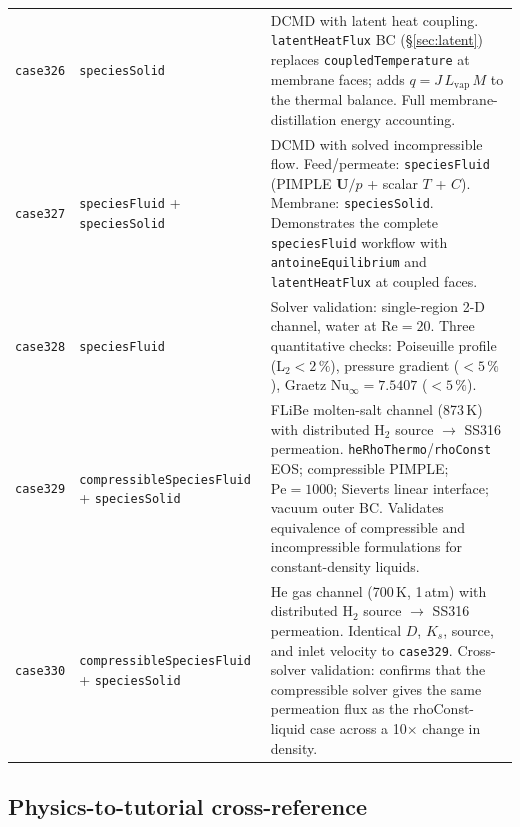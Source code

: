\documentclass[11pt,a4paper]{article}
\newcommand{\caseref}[1]{\texttt{\color{casegreen}#1}}
\newcommand{\bctype}[1]{\texttt{\color{foamblue}#1}}
\begin{document}
\begin{longtable}{%
  >{\raggedright\arraybackslash}p{1.8cm}
  >{\raggedright\arraybackslash}p{5.0cm}
  p{\dimexpr\linewidth-1.8cm-5.0cm-4\tabcolsep\relax}}
\caseref{case326} & \texttt{speciesSolid} &
  DCMD with latent heat coupling.
  \bctype{latentHeatFlux} BC (§\ref{sec:latent}) replaces
  \bctype{coupledTemperature} at membrane faces; adds $q = J\,L_\text{vap}\,M$
  to the thermal balance.  Full membrane-distillation energy accounting. \\[2pt]

\caseref{case327} & \texttt{speciesFluid} + \texttt{speciesSolid} &
  DCMD with solved incompressible flow.  Feed/permeate: \texttt{speciesFluid}
  (PIMPLE $\mathbf{U}/p$ + scalar $T$ + $C$).  Membrane: \texttt{speciesSolid}.
  Demonstrates the complete \texttt{speciesFluid} workflow with
  \bctype{antoineEquilibrium} and \bctype{latentHeatFlux} at coupled faces. \\[2pt]

\caseref{case328} & \texttt{speciesFluid} &
  Solver validation: single-region 2-D channel, water at Re$=20$.
  Three quantitative checks: Poiseuille profile (L$_2 < 2\,\%$),
  pressure gradient ($<5\,\%$), Graetz Nu$_\infty = 7.5407$ ($<5\,\%$). \\[2pt]

\caseref{case329} & \texttt{compressibleSpeciesFluid} + \texttt{speciesSolid} &
  FLiBe molten-salt channel (873\,K) with distributed H$_2$ source $\to$
  SS316 permeation.  \texttt{heRhoThermo}/\texttt{rhoConst} EOS; compressible
  PIMPLE; $\mathrm{Pe} = 1000$; Sieverts linear interface; vacuum outer BC.
  Validates equivalence of compressible and incompressible formulations for
  constant-density liquids. \\[2pt]

\caseref{case330} & \texttt{compressibleSpeciesFluid} + \texttt{speciesSolid} &
  He gas channel (700\,K, 1\,atm) with distributed H$_2$ source $\to$
  SS316 permeation.  Identical $D$, $K_s$, source, and inlet velocity to
  \caseref{case329}.  Cross-solver validation: confirms that the compressible
  solver gives the same permeation flux as the rhoConst-liquid case across
  a 10$\times$ change in density. \\

\end{longtable}

\subsection{Physics-to-tutorial cross-reference}
\end{document}
